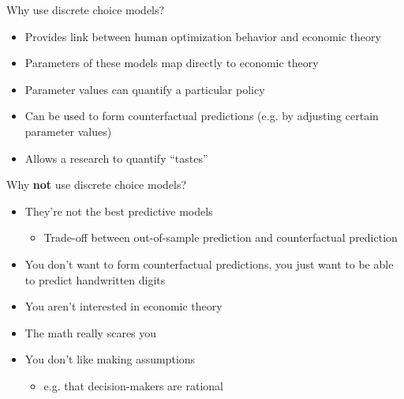 \documentclass[english,aspectratio=169,12pt,xcolor=dvipsnames]{beamer}
\begin{document}
\begin{frame}{Why use discrete choice models?}
\begin{itemize}
\item Provides link between human optimization behavior and economic theory
\item Parameters of these models map directly to economic theory
\item Parameter values can quantify a particular policy
\item Can be used to form counterfactual predictions (e.g. by adjusting certain parameter values)
\item Allows a research to quantify ``tastes''
\end{itemize}
\end{frame}



\begin{frame}{Why \textbf{not} use discrete choice models?}
\begin{itemize}
\item They're not the best predictive models
    \begin{itemize}
    \item Trade-off between out-of-sample prediction and counterfactual prediction
    \end{itemize}
\item You don't want to form counterfactual predictions, you just want to be able to predict handwritten digits
\item You aren't interested in economic theory
\item The math really scares you
\item You don't like making assumptions
    \begin{itemize}
    \item e.g. that decision-makers are rational
    \end{itemize}
\end{itemize}
\end{frame}
\end{document}
